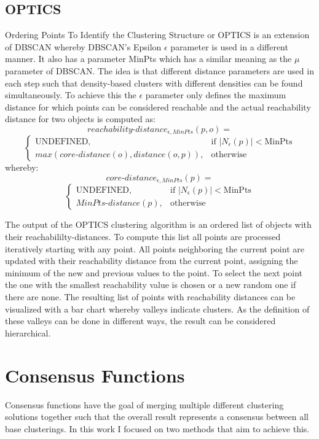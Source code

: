 \documentclass[
	a4paper,
	english,
	twoside,
	openright,               
	11pt                            
	]{report}
\begin{document}
\subsection{OPTICS}\label{sec:opticstheory}
Ordering Points To Identify the Clustering Structure or OPTICS \cite{10.1145/304181.304187} is an extension of DBSCAN whereby DBSCAN's Epsilon $\epsilon$ parameter is used in a different manner. It also has a parameter MinPts which has a similar meaning as the $\mu$ parameter of DBSCAN. The idea is that different distance parameters are used in each step such that density-based clusters with different densities can be found simultaneously. To achieve this the  $\epsilon$ parameter only defines the maximum distance for which points can be considered reachable and the actual reachability distance for two objects is computed as:
$$reachability\text{-}distance_{\epsilon,MinPts}(p,o)=$$
$$
\begin{cases}
    \text{UNDEFINED},& \text{if } |N_\epsilon(p)|< \text{MinPts}\\
    max(core\text{-}distance(o),distance(o,p)),              & \text{otherwise}
\end{cases}
$$
whereby:
$$core\text{-}distance_{\epsilon,MinPts}(p)=$$
$$
\begin{cases}
    \text{UNDEFINED},& \text{if } |N_\epsilon(p)|< \text{MinPts}\\
    MinPts\text{-}distance(p),              & \text{otherwise}
\end{cases}
$$

The output of the OPTICS clustering algorithm is an ordered list of objects with their reachabililty-distances. To compute this list all points are processed iteratively starting with any point. All points neighboring the current point are updated with their reachability distance from the current point, assigning the minimum of the new and previous values to the point. To select the next point the one with the smallest reachability value is chosen or a new random one if there are none. The resulting list of points with reachability distances can be visualized with a bar chart whereby valleys indicate clusters. As the definition of these valleys can be done in different ways, the result can be considered hierarchical.


\section{Consensus Functions}
Consensus functions have the goal of merging multiple different clustering solutions together such that the overall result represents a consensus between all base clusterings. In this work I focused on two methods that aim to achieve this.
\end{document}

